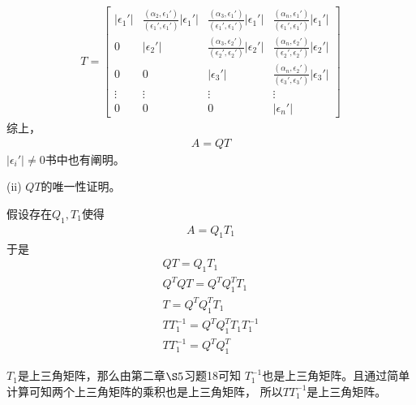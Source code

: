 \documentclass{article}
\begin{document}
\begin{align*}
  T = \begin{bmatrix}
        |\epsilon_1'| & \frac{(\alpha_2, \epsilon_1')}{(\epsilon_1', \epsilon_1')} |\epsilon_1'| & \frac{(\alpha_3, \epsilon_1')}{(\epsilon_1', \epsilon_1')} |\epsilon_1'| & \frac{(\alpha_n, \epsilon_1')}{(\epsilon_1', \epsilon_1')} |\epsilon_1'| \\
        0             & |\epsilon_2'|                                                            & \frac{(\alpha_3, \epsilon_2')}{(\epsilon_2', \epsilon_2')} |\epsilon_2'| & \frac{(\alpha_n, \epsilon_2')}{(\epsilon_2', \epsilon_2')} |\epsilon_2'| \\
        0             & 0                                                                        & |\epsilon_3'|                                                            & \frac{(\alpha_n, \epsilon_2')}{(\epsilon_3', \epsilon_3')} |\epsilon_3'| \\
        \vdots        & \vdots                                                                   & \vdots                                                                   & \vdots                                                                   \\
        0             & 0                                                                        & 0                                                                        & |\epsilon_n'|
      \end{bmatrix}
\end{align*}
综上，
\begin{align*}
  A = Q T
\end{align*}
$|\epsilon_i'| \neq 0$书中也有阐明。

(ii) $QT$的唯一性证明。

假设存在$Q_1, T_1$使得
\begin{align*}
  A = Q_1 T_1
\end{align*}
于是
\begin{align*}
  Q T = Q_1 T_1                       \\
  Q^T Q T = Q^T Q_1^T T_1             \\
  T = Q^T Q_1^T T_1                   \\
  T T_1^{-1} = Q^T Q_1^T T_1 T_1^{-1} \\
  T T_1^{-1} = Q^T Q_1^T
\end{align*}

$T_1$是上三角矩阵，那么由第二章$\S 5$习题18可知
$T_1^{-1}$也是上三角矩阵。且通过简单计算可知两个上三角矩阵的乘积也是上三角矩阵，
所以$T T_1^{-1}$是上三角矩阵。
\end{document}
